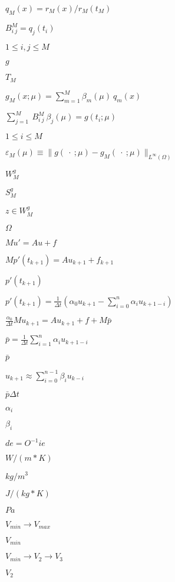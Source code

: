 \documentclass{article}
\begin{document}
$q_M (x) = r_M (x) /r_M (t_M) $
\pagebreak

$B^M_{i \: j} = q_j (t_i)$
\pagebreak

$1 \leq i,j \leq M$
\pagebreak

$g$
\pagebreak

$T_M$
\pagebreak

$g_M (x ; \mu) = \sum^M_{m = 1} \beta_m (\mu) \: q_m (x)$
\pagebreak

$\sum^M_{j = 1} \: B^M_{i \: j} \: \beta_j (\mu) = g (t_i ; \mu)$
\pagebreak

$ 1 \leq i \leq M$
\pagebreak

$\varepsilon_M (\mu) \equiv \| g (\: \cdot \: ; \mu) - g_M (\: \cdot \: ; \mu)\|_{L^{\infty} (\Omega)}$
\pagebreak

$W^g_M$
\pagebreak

$S^g_M$
\pagebreak

$z \in W^g_M$
\pagebreak

$ \Omega $
\pagebreak

$ M u' = A u + f $
\pagebreak

$ M p'(t_{k+1}) = A u_{k+1} + f_{k+1} $
\pagebreak

$ p'(t_{k+1}) $
\pagebreak

$ p'(t_{k+1}) = \frac{1}{\Delta t} (\alpha_0 u_{k+1} - \sum_{i=0}^n \alpha_i u_{k+1-i} )$
\pagebreak

$ \frac{\alpha_0}{\Delta t} M u_{k+1} = A u_{k+1} + f + M \bar{p} $
\pagebreak

$ \bar{p} = \frac{1}{\Delta t} \sum_{i=1}^n \alpha_i u_{k+1-i} $
\pagebreak

$ \bar{p} $
\pagebreak

$ u_{k+1} \approx \sum_{i=0}^{n-1} \beta_i u_{k-i} $
\pagebreak

$ \bar{p} \Delta t $
\pagebreak

$ \alpha_i $
\pagebreak

$ \beta_i $
\pagebreak

$de = O^{-1} ie$
\pagebreak

$ W/(m*K) $
\pagebreak

$ kg/m^3 $
\pagebreak

$ J/(kg*K) $
\pagebreak

$ Pa $
\pagebreak

$V_{min} \rightarrow V_{max} $
\pagebreak

$V_{min}$
\pagebreak

$V_{min} \rightarrow V_2\rightarrow V_3 $
\pagebreak

$V_2$
\pagebreak
\end{document}
